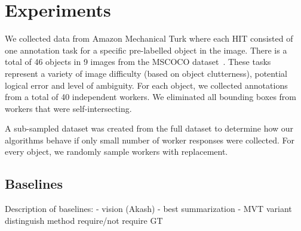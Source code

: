 \documentclass[letterpaper]{article} %
\begin{document}
\section{Experiments}
\par We collected data from Amazon Mechanical Turk where each HIT consisted of one annotation task for a specific pre-labelled object in the image. There is a total of 46 objects in 9 images from the MSCOCO dataset~\cite{Lin2014}. These tasks represent a variety of image difficulty (based on object clutterness), potential logical error and level of ambiguity. For each object, we collected annotations from a total of 40 independent workers. We eliminated all bounding boxes from workers that were self-intersecting.
\par A sub-sampled dataset was created from the full dataset to determine how our algorithms behave if only small number of worker responses were collected. For every object, we randomly sample workers with replacement. 
\subsection{Baselines}
Description of baselines: 
- vision (Akash) 
- best summarization 
- MVT variant 
distinguish method require/not require GT 
\end{document}
